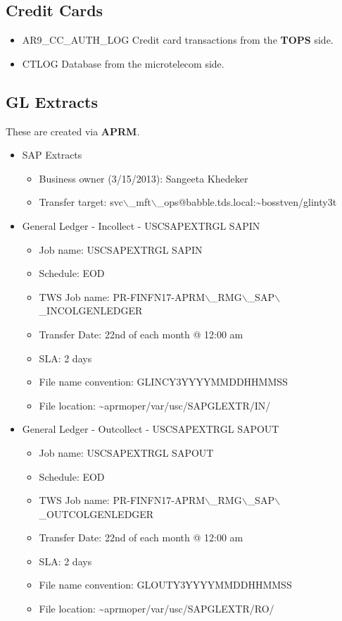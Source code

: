 \documentclass[12pt,twoside]{article}
\begin{document}
\subsection{Credit Cards}
\label{sec:orgheadline33}
\begin{itemize}
\item AR9\_CC\_AUTH\_LOG
      Credit card transactions from the \textbf{TOPS} side.
\item CTLOG
Database from the microtelecom side.
\end{itemize}

\subsection{GL Extracts}
\label{sec:orgheadline34}
These are created via \textbf{APRM}.
\small
\begin{itemize}
\item SAP Extracts
\begin{itemize}
\item Business owner (3/15/2013): Sangeeta Khedeker
\item Transfer target:
svc$\backslash$\_mft$\backslash$\_ops@babble.tds.local:\textasciitilde{}bosstven/glinty3t
\end{itemize}

\item General Ledger - Incollect - USCSAPEXTRGL SAPIN
\begin{itemize}
\item Job name: USCSAPEXTRGL SAPIN
\item Schedule: EOD
\item TWS Job name: PR-FINFN17-APRM$\backslash$\_RMG$\backslash$\_SAP$\backslash$\_INCOLGENLEDGER
\item Transfer Date: 22nd of each month @ 12:00 am
\item SLA: 2 days
\item File name convention: GLINCY3YYYYMMDDHHMMSS
\item File location: \textasciitilde{}aprmoper/var/usc/SAPGLEXTR/IN/
\end{itemize}

\item General Ledger - Outcollect - USCSAPEXTRGL SAPOUT
\begin{itemize}
\item Job name: USCSAPEXTRGL SAPOUT
\item Schedule: EOD
\item TWS Job name: PR-FINFN17-APRM$\backslash$\_RMG$\backslash$\_SAP$\backslash$\_OUTCOLGENLEDGER
\item Transfer Date: 22nd of each month @ 12:00 am
\item SLA: 2 days
\item File name convention: GLOUTY3YYYYMMDDHHMMSS
\item File location: \textasciitilde{}aprmoper/var/usc/SAPGLEXTR/RO/
\end{itemize}


\end{itemize}
\end{document}
